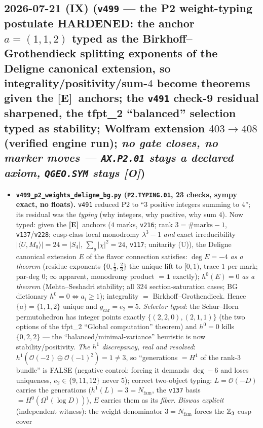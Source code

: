 \documentclass[11pt]{article}
\providecommand{\mE}{\textbf{[E]}}\providecommand{\mC}{\textbf{[C]}}
\providecommand{\mO}{\textbf{[O]}}\providecommand{\mX}{\textbf{[X]}}
\providecommand{\gcar}{g_{\mathrm{car}}}\providecommand{\Nfam}{N_{\mathrm{fam}}}
\begin{document}
\subsection*{2026-07-21 (IX) (\texttt{v499} --- the P2 weight-typing postulate HARDENED: the anchor $a=(1,1,2)$ typed as the Birkhoff--Grothendieck splitting exponents of the Deligne canonical extension, so integrality/positivity/sum-$4$ become theorems given the \mE\ anchors; the \texttt{v491} check-9 residual sharpened, the tfpt\_2 ``balanced'' selection typed as stability; Wolfram extension $403\to408$ (verified engine run); \emph{no gate closes, no marker moves --- \texttt{AX.P2.01} stays a declared axiom, \texttt{QGEO.SYM} stays \mO})}
\begin{itemize}[leftmargin=1.5em]
\item \textbf{\texttt{v499\_p2\_weights\_deligne\_bg.py} (\texttt{P2.TYPING.01}, 23 checks, sympy exact,
no floats).} \texttt{v491} reduced P2 to ``$3$ positive integers summing to $4$''; its residual was the
\emph{typing} (why integers, why positive, why sum $4$). Now typed: given the \mE\ anchors ($4$ marks,
\texttt{v216}; rank $3=\#\text{marks}-1$, \texttt{v137}/\texttt{v228}; cusp-class local monodromy
$\lambda^3-1$ \emph{and} exact irreducibility $|\langle U,M_0\rangle|=24=|S_4|$, $\sum_g|\chi|^2=24$,
\texttt{v117}; unitarity (U)), the Deligne canonical extension $E$ of the flavor connection satisfies:
$\deg E=-4$ \emph{as a theorem} (residue exponents $\{0,\tfrac13,\tfrac23\}$ the unique lift to $[0,1)$,
trace $1$ per mark; par-deg $0$; $\infty$ apparent, monodromy product $=\mathbf1$ exactly);
$h^0(E)=0$ \emph{as a theorem} (Mehta--Seshadri stability; all $324$ section-saturation cases; BG
dictionary $h^0{=}0\Leftrightarrow a_i\ge1$); integrality $=$ Birkhoff--Grothendieck. Hence
$\{a\}=\{1,1,2\}$ unique and $\gcar=e_2=5$. \emph{Selector typed}: the Schur--Horn permutohedron has
integer points exactly $\{(2,2,0),(2,1,1)\}$ (the two options of the tfpt\_2 ``Global computation''
theorem) and $h^0{=}0$ kills $\{0,2,2\}$ --- the ``balanced/minimal-variance'' heuristic is now
stability/positivity. \emph{The $h^1$ discrepancy, real and resolved}: $h^1(\mathcal
O(-2){\oplus}\mathcal O(-1)^2)=1\neq3$, so ``generations $=H^1$ of the rank-$3$ bundle'' is FALSE
(negative control: forcing it demands $\deg-6$ and loses uniqueness, $e_2\in\{9,11,12\}$ never $5$);
correct two-object typing: $L=\mathcal O(-D)$ carries the generations ($h^1(L)=3=\Nfam$, the
\texttt{v137} basis $=H^0(\Omega^1(\log D))$), $E$ carries them as its \emph{fiber}. \emph{Biswas
explicit} (independent witness): the weight denominator $3=\Nfam$ forces the $\mathbb{Z}_3$ cusp cover

\end{itemize}
\end{document}
